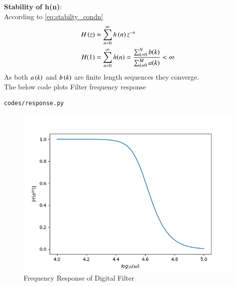 \documentclass[journal,12pt,twocolumn]{IEEEtran}
\theoremstyle{remark}
\begin{document}
\begin{enumerate}[label=\thesection.\arabic*]
\textbf{Stability of h(n)}:\\
According to \eqref{eq:stabilty_condn}
\begin{align}
H\left(z\right) &= \sum_{n = 0}^{\infty} h\left(n\right)z^{-n}\\
H(1)&= \sum_{n = 0}^{\infty}h(n)  = \frac{\sum_{k = 0}^{N}b(k)}{\sum_{k = 0}^{M}a(k)}< \infty
\end{align}
As both $a\left(k\right)$ and $b\left(k\right)$ are finite length sequences they converge.\\
The below code plots Filter frequency response
\begin{lstlisting}
codes/response.py
\end{lstlisting}
\begin{figure}[h!]
\centering
\includegraphics[width=1\columnwidth]{figs/freq_res.png}
\caption{Frequency Response of Digital Filter}
\label{fig:H(w)_6}
\end{figure}


\end{enumerate}
\end{document}
